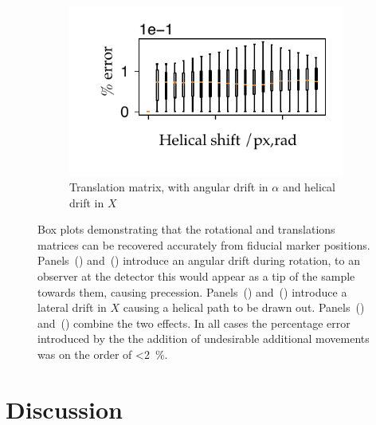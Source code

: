 \begin{figure}
\begin{subfigure}[t]{0.5\textwidth}
          \includegraphics{Chapters/flopt/Figs/PDF/results/helix/decompose/pc_sum_trans_both}
          \caption{Translation matrix, with angular drift in \(\alpha \) and helical drift in \(X\)}\label{fig:pc_sum_trans_both}
        \end{subfigure}
          \caption{Box plots demonstrating that the rotational and translations matrices can be recovered accurately from fiducial marker positions.
          Panels~() and~() introduce an angular drift during rotation, to an observer at the detector this would appear as a tip of the sample towards them, causing precession.
          Panels~() and~() introduce a lateral drift in \(X\) causing a helical path to be drawn out.
          Panels~() and~() combine the two effects.
          In all cases the percentage error introduced by the the addition of undesirable additional movements was on the order of \SI{<2}{\percent}.
          }\label{fig:pc_sum_decompose}
\end{figure}

\section{Discussion}

